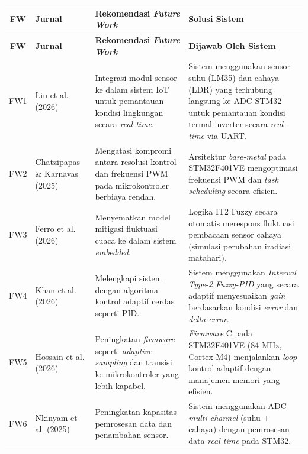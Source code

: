\documentclass[11pt,a4paper]{article}
\begin{document}
\begin{footnotesize}
\setlength{\LTleft}{\fill}
\setlength{\LTright}{\fill}
\begin{longtable}{|c|p{3.2cm}|p{6cm}|p{4.8cm}|}
\hline
\textbf{FW} & \textbf{Jurnal} & \textbf{Rekomendasi \textit{Future Work}} & \textbf{Solusi Sistem} \\
\hline
\endfirsthead

\hline
\textbf{FW} & \textbf{Jurnal} & \textbf{Rekomendasi \textit{Future Work}} & \textbf{Dijawab Oleh Sistem} \\
\hline
\endhead

\hline
\endfoot

FW1 & Liu et al. (2026) & Integrasi modul sensor ke dalam sistem IoT untuk pemantauan kondisi lingkungan secara \textit{real-time}. & Sistem menggunakan sensor suhu (LM35) dan cahaya (LDR) yang terhubung langsung ke ADC STM32 untuk pemantauan kondisi termal inverter secara \textit{real-time} via UART. \\
\hline

FW2 & Chatzipapas \& Karnavas (2025) & Mengatasi kompromi antara resolusi kontrol dan frekuensi PWM pada mikrokontroler berbiaya rendah. & Arsitektur \textit{bare-metal} pada STM32F401VE mengoptimasi frekuensi PWM dan \textit{task scheduling} secara efisien. \\
\hline

FW3 & Ferro et al. (2026) & Menyematkan model mitigasi fluktuasi cuaca ke dalam sistem \textit{embedded}. & Logika IT2 Fuzzy secara otomatis merespons fluktuasi pembacaan sensor cahaya (simulasi perubahan iradiasi matahari). \\
\hline

FW4 & Khan et al. (2026) & Melengkapi sistem dengan algoritma kontrol adaptif cerdas seperti PID. & Sistem menggunakan \textit{Interval Type-2 Fuzzy-PID} yang secara adaptif menyesuaikan \textit{gain} berdasarkan kondisi \textit{error} dan \textit{delta-error}. \\
\hline

FW5 & Hossain et al. (2026) & Peningkatan \textit{firmware} seperti \textit{adaptive sampling} dan transisi ke mikrokontroler yang lebih kapabel. & \textit{Firmware} C pada STM32F401VE (84 MHz, Cortex-M4) menjalankan \textit{loop} kontrol adaptif dengan manajemen memori yang efisien. \\
\hline

FW6 & Nkinyam et al. (2025) & Peningkatan kapasitas pemrosesan data dan penambahan sensor. & Sistem menggunakan ADC \textit{multi-channel} (suhu + cahaya) dengan pemrosesan data \textit{real-time} pada STM32. \\
\hline


\end{longtable}
\end{footnotesize}
\end{document}
